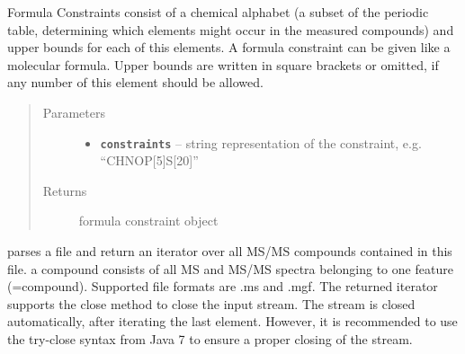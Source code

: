 \documentclass[letterpaper,10pt,openany,oneside]{sphinxmanual}
\begin{document}

\begin{fulllineitems}
\label{library:de.unijena.bioinf.sirius.getFormulaConstraints(String)}
Formula Constraints consist of a chemical alphabet (a subset of the periodic table, determining which elements might occur in the measured compounds) and upper bounds for each of this elements. A formula constraint can be given like a molecular formula. Upper bounds are written in square brackets or omitted, if any number of this element should be allowed.
\begin{quote}\begin{description}
\item[{Parameters}] \leavevmode\begin{itemize}
\item {} 
\textbf{\texttt{constraints}} -- string representation of the constraint, e.g. ``CHNOP{[}5{]}S{[}20{]}''

\end{itemize}

\item[{Returns}] \leavevmode
formula constraint object

\end{description}\end{quote}

\end{fulllineitems}


\begin{fulllineitems}
\label{library:de.unijena.bioinf.sirius.parseExperiment(File)}
parses a file and return an iterator over all MS/MS compounds contained in this file.
a compound consists of all MS and MS/MS spectra belonging to one feature (=compound). Supported file formats are .ms and .mgf. The returned iterator supports the close method to close the input stream. The stream is closed automatically, after iterating the last element. However, it is recommended to use the try-close syntax from Java 7 to ensure a proper closing of the stream.

\end{fulllineitems}
\end{document}
